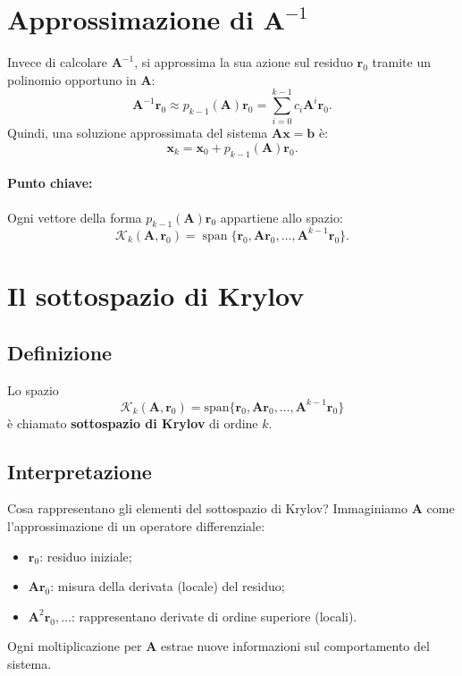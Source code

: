 \section{Approssimazione di $\mathbf{A}^{-1}$}
Invece di calcolare $\mathbf{A}^{-1}$, si approssima la sua azione sul residuo $\mathbf{r}_0$ tramite un polinomio opportuno in $\mathbf{A}$:
\[
\mathbf{A}^{-1} \mathbf{r}_0 \approx p_{k-1}(\mathbf{A}) \mathbf{r}_0 = \sum_{i=0}^{k-1} c_i \mathbf{A}^i \mathbf{r}_0. \tag{3}
\]
Quindi, una soluzione approssimata del sistema $\mathbf{A} \mathbf{x} = \mathbf{b}$ è:
\[
\mathbf{x}_k = \mathbf{x}_0 + p_{k-1}(\mathbf{A}) \mathbf{r}_0. \tag{4}
\]
\paragraph{Punto chiave:}
Ogni vettore della forma $p_{k-1}(\mathbf{A}) \mathbf{r}_0$ appartiene allo spazio:
\[
\mathcal{K}_k(\mathbf{A}, \mathbf{r}_0) = \operatorname{span}\{\mathbf{r}_0, \mathbf{A} \mathbf{r}_0, \dots, \mathbf{A}^{k-1} \mathbf{r}_0\}. \tag{5}
\]

\section{Il sottospazio di Krylov}
\subsection{Definizione}
Lo spazio
\[
\mathcal{K}_k(\mathbf{A},\mathbf{r}_0) = \mathrm{span}\{\mathbf{r}_0,\mathbf{A}\mathbf{r}_0,\dots ,\mathbf{A}^{k - 1}\mathbf{r}_0\}
\]
è chiamato \textbf{sottospazio di Krylov} di ordine $k$.

\subsection{Interpretazione}
Cosa rappresentano gli elementi del sottospazio di Krylov? Immaginiamo $\mathbf{A}$ come l'approssimazione di un operatore differenziale:
\begin{itemize}
	\item $\mathbf{r}_0$: residuo iniziale;
	\item $\mathbf{A}\mathbf{r}_0$: misura della derivata (locale) del residuo;
	\item $\mathbf{A}^2\mathbf{r}_0, \ldots$: rappresentano derivate di ordine superiore (locali).
\end{itemize}
Ogni moltiplicazione per $\mathbf{A}$ estrae nuove informazioni sul comportamento del sistema.

